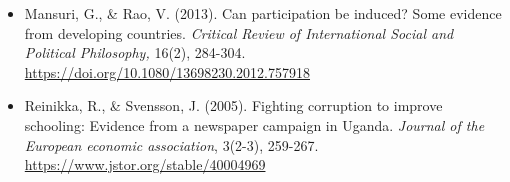 \documentclass[letterpaper,12pt,parskip=full,DIV=10]{scrartcl}
\begin{document}
\begin{itemize}
\item Mansuri, G., \& Rao, V. (2013). Can participation be induced? Some evidence from developing countries. \emph{Critical Review of International Social and Political Philosophy,} 16(2), 284-304. \url{https://doi.org/10.1080/13698230.2012.757918}

\item Reinikka, R., \& Svensson, J. (2005). Fighting corruption to improve schooling: Evidence from a newspaper campaign in Uganda. \emph{Journal of the European economic association}, 3(2-3), 259-267. \url{https://www.jstor.org/stable/40004969}

\end{itemize}
\end{document}
